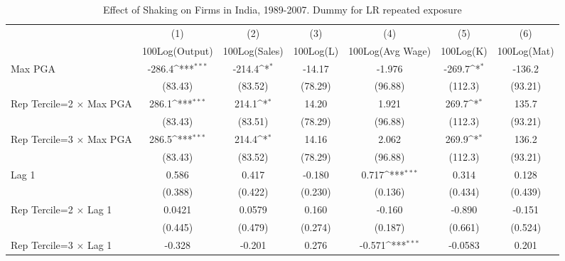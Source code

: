 \begin{table}[htbp]\centering
\def\sym#1{\ifmmode^{#1}\else\(^{#1}\)\fi}
\caption{Effect of Shaking on Firms in India, 1989-2007. Dummy for LR repeated exposure}
\begin{tabular}{l*{6}{c}}
\toprule
                &\multicolumn{1}{c}{(1)}&\multicolumn{1}{c}{(2)}&\multicolumn{1}{c}{(3)}&\multicolumn{1}{c}{(4)}&\multicolumn{1}{c}{(5)}&\multicolumn{1}{c}{(6)}\\
                &\multicolumn{1}{c}{100Log(Output)}&\multicolumn{1}{c}{100Log(Sales)}&\multicolumn{1}{c}{100Log(L)}&\multicolumn{1}{c}{100Log(Avg Wage)}&\multicolumn{1}{c}{100Log(K)}&\multicolumn{1}{c}{100Log(Mat)}\\
\midrule
Max PGA         &   -286.4\sym{***}&   -214.4\sym{*}  &   -14.17         &   -1.976         &   -269.7\sym{*}  &   -136.2         \\
                &  (83.43)         &  (83.52)         &  (78.29)         &  (96.88)         &  (112.3)         &  (93.21)         \\
\addlinespace
Rep Tercile=2 $\times$ Max PGA&    286.1\sym{***}&    214.1\sym{*}  &    14.20         &    1.921         &    269.7\sym{*}  &    135.7         \\
                &  (83.43)         &  (83.51)         &  (78.29)         &  (96.88)         &  (112.3)         &  (93.21)         \\
\addlinespace
Rep Tercile=3 $\times$ Max PGA&    286.5\sym{***}&    214.4\sym{*}  &    14.16         &    2.062         &    269.9\sym{*}  &    136.2         \\
                &  (83.43)         &  (83.52)         &  (78.29)         &  (96.88)         &  (112.3)         &  (93.21)         \\
\addlinespace
Lag 1           &    0.586         &    0.417         &   -0.180         &    0.717\sym{***}&    0.314         &    0.128         \\
                &  (0.388)         &  (0.422)         &  (0.230)         &  (0.136)         &  (0.434)         &  (0.439)         \\
\addlinespace
Rep Tercile=2 $\times$ Lag 1&   0.0421         &   0.0579         &    0.160         &   -0.160         &   -0.890         &   -0.151         \\
                &  (0.445)         &  (0.479)         &  (0.274)         &  (0.187)         &  (0.661)         &  (0.524)         \\
\addlinespace
Rep Tercile=3 $\times$ Lag 1&   -0.328         &   -0.201         &    0.276         &   -0.571\sym{***}&  -0.0583         &    0.201         \\

\end{tabular}
\end{table}
